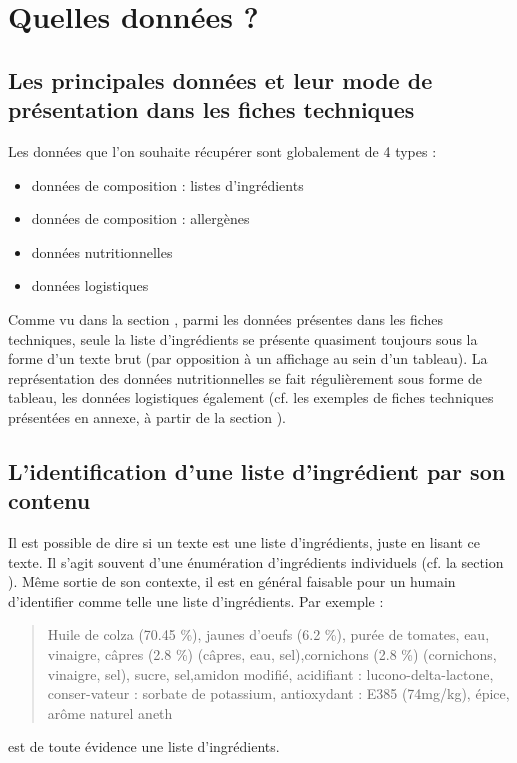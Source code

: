         \section{Quelles données ?}

            \subsection{Les principales données et leur mode de présentation dans les fiches techniques}
            Les données que l'on souhaite récupérer sont globalement de 4 types : 
            \begin{itemize}
                \item données de composition : listes d'ingrédients
                \item données de composition : allergènes
                \item données nutritionnelles
                \item données logistiques
            \end{itemize}

            Comme vu dans la section , parmi les données présentes dans les fiches techniques, seule la liste d'ingrédients se présente quasiment toujours sous la forme d'un texte brut (par opposition à un affichage au sein d'un tableau).
            La représentation des données nutritionnelles se fait régulièrement sous forme de tableau, les données logistiques également (cf. les exemples de fiches techniques présentées en annexe, à partir de la section ).
        
            \subsection{L'identification d'une liste d'ingrédient par son contenu}

            Il est possible de dire si un texte est une liste d'ingrédients, juste en lisant ce texte.
            Il s'agit souvent d'une énumération d'ingrédients individuels (cf. la section ).
            Même sortie de son contexte, il est en général faisable pour un humain d'identifier comme telle une liste d'ingrédients.
            Par exemple : 
            \begin{quotation}
                Huile de colza (70.45 \%), jaunes d’oeufs (6.2 \%), purée de tomates, eau, vinaigre, câpres (2.8 \%) (câpres, eau, sel),cornichons (2.8 \%) (cornichons, vinaigre, sel), sucre, sel,amidon modifié, acidifiant : lucono-delta-lactone, conser-vateur : sorbate de potassium, antioxydant : E385 (74mg/kg), épice, arôme naturel aneth
            \end{quotation}
            est de toute évidence une liste d'ingrédients.

